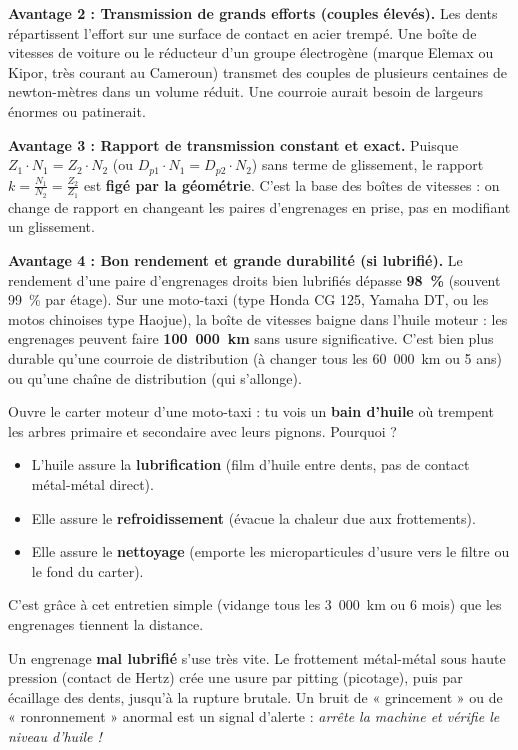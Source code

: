 \documentclass[11pt]{article}
\newcommand{\cle}[1]{{\popxbold\color{popdark}#1}}
\newcounter{popsec}
\newcounter{popsub}
\newcommand{\courssub}[1]{%
  \stepcounter{popsub}%
  \par\vspace{9pt}\noindent{\popxbold\fontsize{11.5}{13}\selectfont\color{popink}{\color{poporange}\thepopsec.\thepopsub}\hspace{6pt}#1}\par\nopagebreak\vspace{4pt}
}
\begin{document}
\textbf{Avantage 2 : Transmission de grands efforts (couples élevés).} Les dents répartissent l'effort sur une surface de contact en acier trempé. Une boîte de vitesses de voiture ou le réducteur d'un \cle{groupe électrogène} (marque Elemax ou Kipor, très courant au Cameroun) transmet des couples de plusieurs centaines de newton-mètres dans un volume réduit. Une courroie aurait besoin de largeurs énormes ou patinerait.

\textbf{Avantage 3 : Rapport de transmission constant et exact.} Puisque $Z_1 \cdot N_1 = Z_2 \cdot N_2$ (ou $D_{p1} \cdot N_1 = D_{p2} \cdot N_2$) sans terme de glissement, le rapport $k = \frac{N_1}{N_2} = \frac{Z_2}{Z_1}$ est \textbf{figé par la géométrie}. C'est la base des \cle{boîtes de vitesses} : on change de rapport en changeant les paires d'engrenages en prise, pas en modifiant un glissement.

\textbf{Avantage 4 : Bon rendement et grande durabilité (si lubrifié).} Le rendement d'une paire d'engrenages droits bien lubrifiés dépasse \textbf{98~\%} (souvent 99~\% par étage). Sur une moto-taxi (type Honda CG 125, Yamaha DT, ou les motos chinoises type Haojue), la boîte de vitesses baigne dans l'huile moteur : les engrenages peuvent faire \textbf{100~000~km} sans usure significative. C'est bien plus durable qu'une courroie de distribution (à changer tous les 60~000~km ou 5 ans) ou qu'une chaîne de distribution (qui s'allonge).

\begin{exemplebox}
Ouvre le carter moteur d'une moto-taxi : tu vois un \textbf{bain d'huile} où trempent les arbres primaire et secondaire avec leurs pignons. Pourquoi ?
\begin{itemize}
    \item L'huile assure la \textbf{lubrification} (film d'huile entre dents, pas de contact métal-métal direct).
    \item Elle assure le \textbf{refroidissement} (évacue la chaleur due aux frottements).
    \item Elle assure le \textbf{nettoyage} (emporte les microparticules d'usure vers le filtre ou le fond du carter).
\end{itemize}
C'est grâce à cet entretien simple (vidange tous les 3~000~km ou 6 mois) que les engrenages tiennent la distance.
\end{exemplebox}

\courssub{Les quatre inconvénients majeurs}

\begin{attention}
Un engrenage \textbf{mal lubrifié} s'use très vite. Le frottement métal-métal sous haute pression (contact de Hertz) crée une usure par \cle{pitting} (picotage), puis par \cle{écaillage} des dents, jusqu'à la \cle{rupture} brutale. Un bruit de « grincement » ou de « ronronnement » anormal est un signal d'alerte : \emph{arrête la machine et vérifie le niveau d'huile !}
\end{attention}
\end{document}
